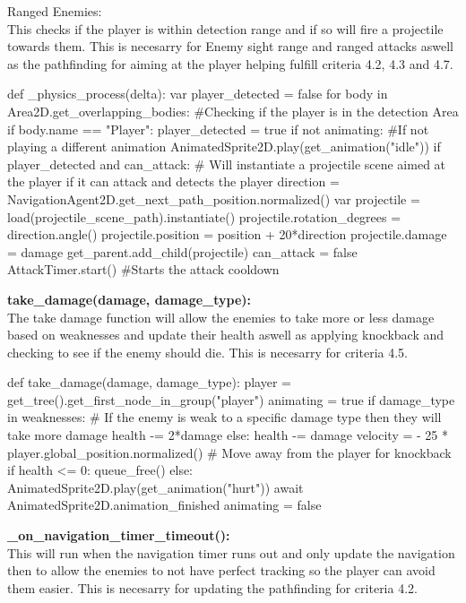 \documentclass{article}
\begin{document}
        Ranged Enemies:\\
        This checks if the player is within detection range and if so will fire a projectile towards them. This is necesarry for Enemy sight range and ranged attacks aswell as the pathfinding for aiming at the player helping fulfill criteria 4.2, 4.3 and 4.7.\\
        \begin{python}
def _physics_process(delta):
   var player_detected = false
   for body in Area2D.get_overlapping_bodies: #Checking if the player is in the detection Area
      if body.name == "Player":
         player_detected = true
   if not animating: #If not playing a different animation
      AnimatedSprite2D.play(get_animation("idle"))
      if player_detected and can_attack: # Will instantiate a projectile scene aimed at the player if it can attack and detects the player
         direction = NavigationAgent2D.get_next_path_position.normalized()
         var projectile = load(projectile_scene_path).instantiate()
         projectile.rotation_degrees = direction.angle()
         projectile.position = position + 20*direction
         projectile.damage = damage
         get_parent.add_child(projectile)
         can_attack = false
         AttackTimer.start() #Starts the attack cooldown
        \end{python}
        \textbf{take\_damage(damage, damage\_type):}\\
        The take damage function will allow the enemies to take more or less damage based on weaknesses and update their health aswell as applying knockback and checking to see if the enemy should die. This is necesarry for criteria 4.5.\\
        \begin{python}
def take_damage(damage, damage_type):
   player = get_tree().get_first_node_in_group("player")
   animating = true
   if damage_type in weaknesses: # If the enemy is weak to a specific damage type then they will take more damage
      health -= 2*damage
   else:
      health -= damage
   velocity = - 25 * player.global_position.normalized() # Move away from the player for knockback
   if health <= 0:
      queue_free()
   else:
      AnimatedSprite2D.play(get_animation("hurt"))
      await AnimatedSprite2D.animation_finished
      animating = false
        \end{python}
        \textbf{\_on\_navigation\_timer\_timeout():}\\
        This will run when the navigation timer runs out and only update the navigation then to allow the enemies to not have perfect tracking so the player can avoid them easier. This is necesarry for updating the pathfinding for criteria 4.2.\\
\end{document}
